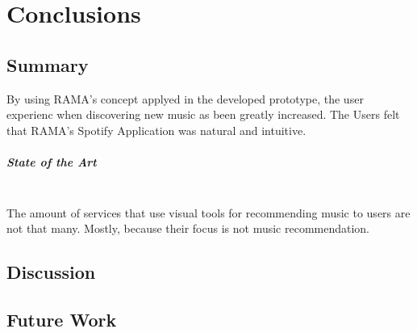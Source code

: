 
\chapter{Conclusions}
\label{chap:chap5}

\section*{}


\section{Summary} %
\label{sec:summary}

  By using RAMA's concept applyed in the developed prototype, the user experienc when discovering new music as been greatly increased.
  The Users felt that RAMA's Spotify Application was natural and intuitive.


  \paragraph*{State of the Art} \hfill \\
  \indent The amount of services that use visual tools for recommending music to users are not that many.
  Mostly, because their focus is not music recommendation.




\section{Discussion} %
\label{sec:discussion}



\section{Future Work} %
\label{sec:future_work}


